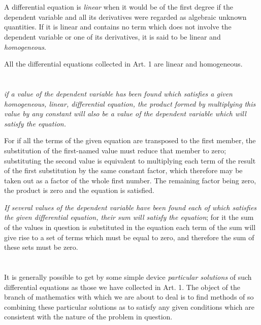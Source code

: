 \documentclass[oneside,12pt]{book}
\begin{document}
\section{} A differential equation is \textit{linear} when it would be of the first degree if the dependent variable and all its derivatives were regarded as algebraic unknown quantities. If it is linear and contains no term which does not involve the dependent variable or one of its derivatives, it is said to be linear and \textit{homogeneous}. \par 

All the differential equations collected in Art. 1 are linear and homogeneous. \par 

\section{} \textit{if a value of the dependent variable has been found which satisfies a given homogeneous, linear, differential equation, the product formed by multiplying this value by any constant will also be a value of the dependent variable which will satisfy the equation.} \par 

For if all the terms of the given equation are transposed to the first member, the substitution of the first-named value must reduce that member to zero; substituting the second value is equivalent to multiplying each term of the result of the first substitution by the same constant factor, which therefore may be taken out as a factor of the whole first number. The remaining factor being zero, the product is zero and the equation is satisfied. \par 

\textit{If several values of the dependent variable have been found each of which satisfies the given differential equation, their sum will satisfy the equation}; for it the sum of the values in question is substituted in the equation each term of the sum will give rise to a set of terms which must be equal to zero, and therefore the sum of these sets must be zero. \par 

\section{} It is generally possible to get by some simple device \textit{particular solutions} of such differential equations as those we have collected in Art. 1. The object of the branch of mathematics with which we are about to deal is to find methods of so combining these particular solutions as to satisfy any given conditions which are consistent with the nature of the problem in question. \par 
\end{document}
